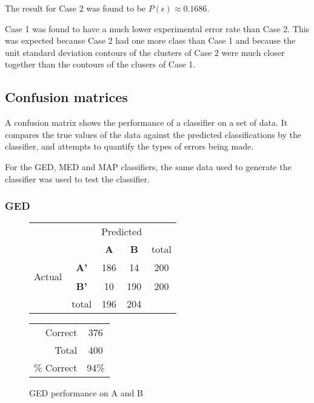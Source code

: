 The result for Case 2 was found to be $P(\epsilon)\approx0.1686$.

Case 1 was found to have a much lower experimental error rate than Case 2. This was expected because Case 2 had one more class than Case 1 and because the unit standard deviation contours of the clusters of Case 2 were much closer together than the contours of the clusers of Case 1.
 
\subsection{Confusion matrices}

A confusion matrix shows the performance of a classifier on a set of data. It compares the true values of the data against the predicted classifications by the classifier, and attempts to quantify the types of errors being made.

For the GED, MED and MAP classifiers, the same data used to generate the classifier was used to test the classifier.

\clearpage

\subsubsection{GED}
\begin{figure}[!ht]
\begin{minipage}[b]{0.5\linewidth}
\centering
	\begin{tabular}{ccc|c|c}
	 & &\multicolumn{2}{c}{Predicted} &\\
	  & & \bf{A} &  \bf{B} & total \\
	 \cline{3-5}
	 \multirow{2}{*}{\begin{sideways}Actual\end{sideways}} & \bf{A'}& 186 & 14 & 200 \\
	 \cline{3-5}
	 & \bf{B'}& 10 & 190 & 200 \\
	  \cline{3-5}
	 &total&196&204&\\
	\end{tabular}
\end{minipage}
\hspace{0.5cm}
\begin{minipage}[b]{0.5\linewidth}
	\begin{tabular}{r|c}
	\hline
	Correct& 376\\
	Total& 400\\
	\hline
	\% Correct& 94\%\\
	\hline
	\end{tabular}
\end{minipage}
\vspace{1mm}
\caption{GED performance on A and B}
\end{figure}

